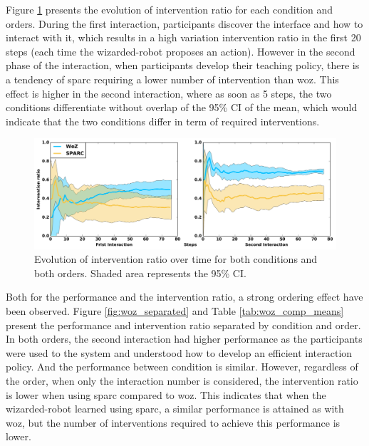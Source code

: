 Figure \ref{fig:woz_ratio_time} presents the evolution of intervention ratio for each condition and orders. During the first interaction, participants discover the interface and how to interact with it, which results in a high variation intervention ratio in the first 20 steps (each time the wizarded-robot proposes an action). However in the second phase of the interaction,  when participants develop their teaching policy, there is a tendency of \gls{sparc} requiring a lower number of intervention than \gls{woz}. This effect is higher in the second interaction, where as soon as 5 steps, the two conditions differentiate without overlap of the 95\% CI of the mean, which would indicate that the two conditions differ in term of required interventions.

\begin{figure}[ht]
	\centering
	\includegraphics[width=1.\textwidth]{ratio_time.pdf}
	\caption{Evolution of intervention ratio over time for both conditions and both orders. Shaded area represents the 95\% CI.}
	\label{fig:woz_ratio_time}
\end{figure}

Both for the performance and the intervention ratio, a strong ordering effect have been observed. Figure \ref{fig:woz_separated} and Table \ref{tab:woz_comp_means} present the performance and intervention ratio separated by condition and order. In both orders, the second interaction had higher performance as the participants were used to the system and understood how to develop an efficient interaction policy. And the performance between condition is similar. However, regardless of the order, when only the interaction number is considered, the intervention ratio is lower when using \gls{sparc} compared to \gls{woz}. This indicates that when the wizarded-robot learned using \gls{sparc}, a similar performance is attained as with \gls{woz}, but the number of interventions required to achieve this performance is lower.


